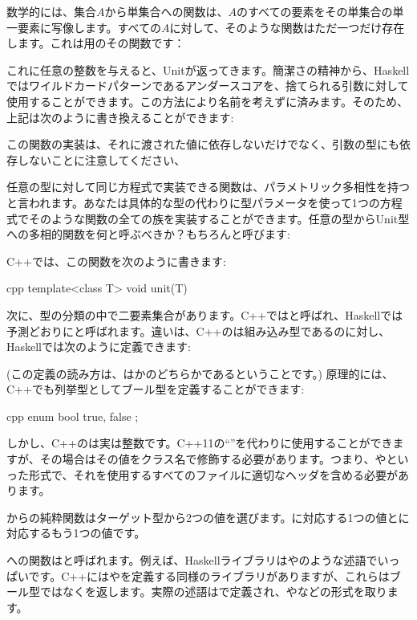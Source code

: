数学的には、集合$A$から単集合への関数は、$A$のすべての要素をその単集合の単一要素に写像します。すべての$A$に対して、そのような関数はただ一つだけ存在します。これは用のその関数です：

これに任意の整数を与えると、Unitが返ってきます。簡潔さの精神から、Haskellではワイルドカードパターンであるアンダースコアを、捨てられる引数に対して使用することができます。この方法により名前を考えずに済みます。そのため、上記は次のように書き換えることができます: 

この関数の実装は、それに渡された値に依存しないだけでなく、引数の型にも依存しないことに注意してください、

任意の型に対して同じ方程式で実装できる関数は、パラメトリック多相性を持つと言われます。あなたは具体的な型の代わりに型パラメータを使って1つの方程式でそのような関数の全ての族を実装することができます。任意の型からUnit型への多相的関数を何と呼ぶべきか？もちろんと呼びます: 

C++では、この関数を次のように書きます: 

\begin{snip}{cpp}
template<class T>
void unit(T) {}
\end{snip}
次に、型の分類の中で二要素集合があります。C++ではと呼ばれ、Haskellでは予測どおりにと呼ばれます。違いは、C++のは組み込み型であるのに対し、Haskellでは次のように定義できます: 

(この定義の読み方は、はかのどちらかであるということです。) 原理的には、C++でも列挙型としてブール型を定義することができます: 

\begin{snip}{cpp}
enum bool {
    true,
    false
};
\end{snip}
しかし、C++のは実は整数です。C++11の``''を代わりに使用することができますが、その場合はその値をクラス名で修飾する必要があります。つまり、やといった形式で、それを使用するすべてのファイルに適切なヘッダを含める必要があります。

からの純粋関数はターゲット型から2つの値を選びます。に対応する1つの値とに対応するもう1つの値です。

への関数はと呼ばれます。例えば、Haskellライブラリはやのような述語でいっぱいです。C++にはやを定義する同様のライブラリがありますが、これらはブール型ではなくを返します。実際の述語はで定義され、やなどの形式を取ります。

